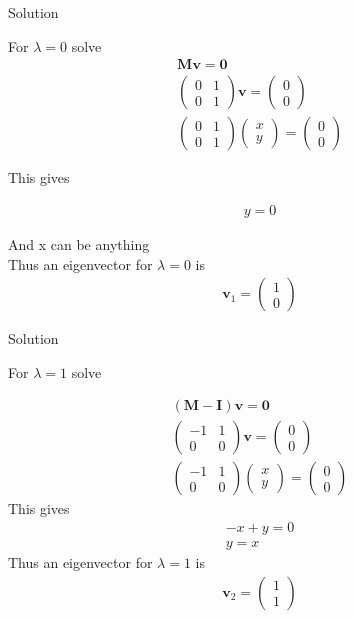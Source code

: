 \documentclass{beamer}
\numberwithin{equation}{section}
\theoremstyle{remark}
\newcommand{\myvec}[1]{\ensuremath{\begin{pmatrix}#1\end{pmatrix}}}
\let\vec\mathbf
\begin{document}
\begin{frame}{Solution}

For $\lambda = 0$ solve 
\begin{align}
\vec{M}\vec{v}=\vec{0}\\
\myvec{0 & 1 \\ 0 & 1}\vec{v} = \myvec{0\\0}\\
\myvec{0 & 1\\0 & 1}\myvec{x\\y} = \myvec{0\\0}
\end{align}

\pagebreak

This gives 

\begin{align}
y = 0
\end{align}

And x can be anything\\

Thus an eigenvector for $\lambda=0$ is 
\begin{align} 
\vec{v}_1 = \myvec{1\\0}
\end{align}

\end{frame}

\begin{frame}{Solution}

For $\lambda = 1$ solve 

\begin{align}
(\vec{M}-\vec{I})\vec{v}=\vec{0}\\
\myvec{-1 & 1 \\ 0 & 0}\vec{v} = \myvec{0\\0}\\
\myvec{-1 & 1 \\ 0 & 0}\myvec{x\\y} = \myvec{0\\0}
\end{align}
This gives 
\begin{align}
-x + y = 0 \\
y = x
\end{align}
Thus an eigenvector for $\lambda=1$ is
\begin{align}
\vec{v}_2 = \myvec{1\\1}
\end{align}

\end{frame}
\end{document}
